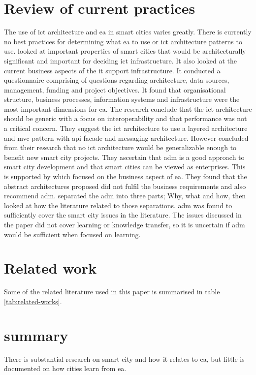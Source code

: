 \section{Review of current practices}
The use of \gls{ict} architecture and \gls{ea} in smart cities varies greatly. There is currently no best practices for determining what \gls{ea} to use or \gls{ict} architecture patterns to use.
\cite{kakarontzas2014} looked at important properties of smart cities that would be architecturally significant and important for deciding \gls{ict} infrastructure. It also looked at the current business aspects of the \gls{it} support infrastructure. It conducted a questionnaire comprising of questions regarding architecture, data sources, management, funding and project objectives. It found that organisational structure, business processes, information systems and infrastructure were the most important dimensions for \gls{ea}. The research conclude that the \gls{ict} architecture should be generic with a focus on interoperability and that performance was not a critical concern. They suggest the \gls{ict} architecture to use a layered architecture and \gls{mvc} pattern with \gls{api} facade and messaging architecture.
However \cite{7580810} concluded from their research that no \gls{ict} architecture would be generalizable enough to benefit new smart city projects. They ascertain that \gls{adm} is a good approach to smart city development and that smart cities can be viewed as enterprises. This is supported by \cite{pourzolfaghar2016types} which focused on the business aspect of \gls{ea}. They found that the abstract architectures proposed did not fulfil the business requirements and also recommend \gls{adm}. \cite{7580810} separated the \gls{adm} into three parts; Why, what and how, then looked at how the literature related to those separations. \gls{adm} was found to sufficiently cover the smart city issues in the literature. The issues discussed in the paper did not cover learning or knowledge transfer, so it is uncertain if \gls{adm} would be sufficient when focused on learning.

\section{Related work}

Some of the related literature used in this paper is summarised in table \ref{tab:related-works}. 

\section{summary}
There is substantial research on smart city and how it relates to \gls{ea}, but little is documented on how cities learn from \gls{ea}.